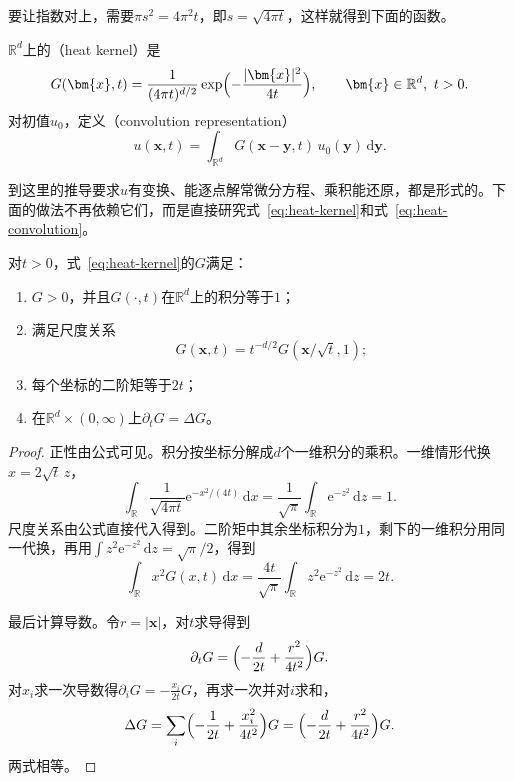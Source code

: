 要让指数对上，需要$\pi s^2=4\pi^2t$，即$s=\sqrt{4\pi t}$，这样就得到下面的函数。

\begin{definition}[热核]
\label{def:heat-kernel}
$\mathbb{R}^{d}$上的（heat kernel）是
\begin{equation}
 G(\bm{x},t)=\frac{1}{(4\pi t)^{d/2}}\exp\Bigl(-\frac{\lvert\bm{x}\rvert^2}{4t}\Bigr),\qquad \bm{x}\in\mathbb{R}^{d},\ t>0 .
 \label{eq:heat-kernel}
\end{equation}
对初值$u_0$，定义（convolution representation）
\begin{equation}
 u(\bm{x},t)=\int_{\mathbb{R}^{d}}G(\bm{x}-\bm{y},t)\,u_0(\bm{y})\,\mathrm{d}\bm{y} .
 \label{eq:heat-convolution}
\end{equation}
\end{definition}

到这里的推导要求$u$有变换、能逐点解常微分方程、乘积能还原，都是形式的。下面的做法不再依赖它们，而是直接研究式~\eqref{eq:heat-kernel}和式~\eqref{eq:heat-convolution}。

\begin{theorem}[热核的基本性质]
\label{thm:heat-kernel-properties}
对$t>0$，式~\eqref{eq:heat-kernel}的$G$满足：
\begin{enumerate}
 \item $G>0$，并且$G(\cdot,t)$在$\mathbb{R}^{d}$上的积分等于$1$；
 \item 满足尺度关系
 \begin{equation}
  G(\bm{x},t)=t^{-d/2}G(\bm{x}/\sqrt{t},1) ;
  \label{eq:heat-kernel-scaling}
 \end{equation}
 \item 每个坐标的二阶矩等于$2t$；
 \item 在$\mathbb{R}^{d}\times(0,\infty)$上$\partial_tG=\Delta G$。
\end{enumerate}
\end{theorem}

\begin{proof}
正性由公式可见。积分按坐标分解成$d$个一维积分的乘积。一维情形代换$x=2\sqrt{t}\,z$，
\[
 \int_{\mathbb{R}}\frac{1}{\sqrt{4\pi t}}\mathrm{e}^{-x^2/(4t)}\,\mathrm{d}x=\frac{1}{\sqrt\pi}\int_{\mathbb{R}}\mathrm{e}^{-z^2}\,\mathrm{d}z=1 .
\]
尺度关系由公式直接代入得到。二阶矩中其余坐标积分为$1$，剩下的一维积分用同一代换，再用$\int z^2\mathrm{e}^{-z^2}\,\mathrm{d}z=\sqrt\pi/2$，得到
\[
 \int_{\mathbb{R}}x^2G(x,t)\,\mathrm{d}x=\frac{4t}{\sqrt\pi}\int_{\mathbb{R}}z^2\mathrm{e}^{-z^2}\,\mathrm{d}z=2t .
\]

最后计算导数。令$r=\lvert\bm{x}\rvert$，对$t$求导得到
\[
 \partial_tG=\Bigl(-\frac{d}{2t}+\frac{r^2}{4t^2}\Bigr)G .
\]
对$x_i$求一次导数得$\partial_iG=-\tfrac{x_i}{2t}G$，再求一次并对$i$求和，
\[
 \Delta G=\sum_{i}\Bigl(-\frac{1}{2t}+\frac{x_i^2}{4t^2}\Bigr)G=\Bigl(-\frac{d}{2t}+\frac{r^2}{4t^2}\Bigr)G .
\]
两式相等。
\end{proof}

